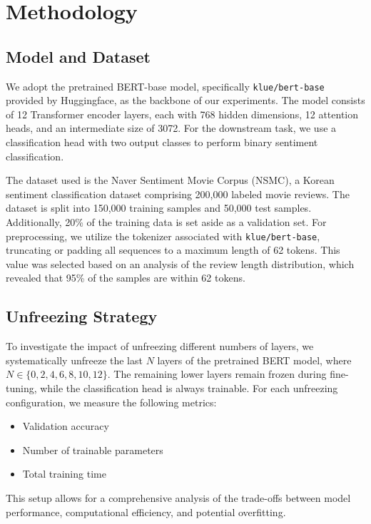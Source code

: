 \documentclass{article}
\begin{document}
\section{Methodology}

\subsection{Model and Dataset}

We adopt the pretrained BERT-base model, specifically \texttt{klue/bert-base} provided by Huggingface, as the backbone of our experiments. The model consists of 12 Transformer encoder layers, each with 768 hidden dimensions, 12 attention heads, and an intermediate size of 3072. For the downstream task, we use a classification head with two output classes to perform binary sentiment classification.

The dataset used is the Naver Sentiment Movie Corpus (NSMC), a Korean sentiment classification dataset comprising 200,000 labeled movie reviews. The dataset is split into 150,000 training samples and 50,000 test samples. Additionally, 20\% of the training data is set aside as a validation set. For preprocessing, we utilize the tokenizer associated with \texttt{klue/bert-base}, truncating or padding all sequences to a maximum length of 62 tokens. This value was selected based on an analysis of the review length distribution, which revealed that 95\% of the samples are within 62 tokens.

\subsection{Unfreezing Strategy}

To investigate the impact of unfreezing different numbers of layers, we systematically unfreeze the last $N$ layers of the pretrained BERT model, where $N \in \{0, 2, 4, 6, 8, 10, 12\}$. The remaining lower layers remain frozen during fine-tuning, while the classification head is always trainable. For each unfreezing configuration, we measure the following metrics:
\begin{itemize}
    \item Validation accuracy
    \item Number of trainable parameters
    \item Total training time
\end{itemize}
This setup allows for a comprehensive analysis of the trade-offs between model performance, computational efficiency, and potential overfitting.
\end{document}
